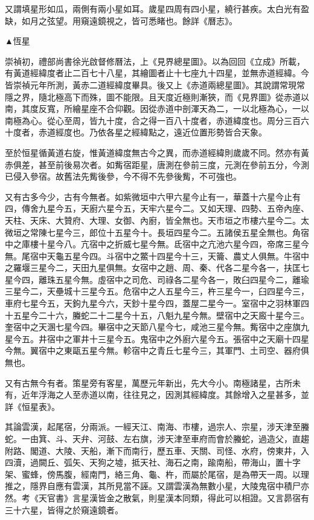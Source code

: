 \begin{pinyinscope}
又謂填星形如瓜，兩側有兩小星如耳。歲星四周有四小星，繞行甚疾。太白光有盈缺，如月之弦望。用窺遠鏡視之，皆可悉睹也。餘詳《曆志》。

▲恆星

崇禎初，禮部尚書徐光啟督修曆法，上《見界總星圖》。以為回回《立成》所載，有黃道經緯度者止二百七十八星，其繪圖者止十七座九十四星，並無赤道經緯。今皆崇禎元年所測，黃赤二道經緯度畢具。後又上《赤道兩總星圖》。其說謂常現常隱之界，隨北極高下而殊，圖不能限。且天度近極則漸狹，而《見界圖》從赤道以南，其度反寬，所繪星座不合仰觀。因從赤道中剖渾天為二，一以北極為心，一以南極為心。從心至周，皆九十度，合之得一百八十度者，赤道緯度也。周分三百六十度者，赤道經度也。乃依各星之經緯點之，遠近位置形勢皆合天象。

至於恒星循黃道右旋，惟黃道緯度無古今之異，而赤道經緯則歲歲不同。然亦有黃赤俱差，甚至前後易次者。如觜宿距星，唐測在參前三度，元測在參前五分，今測已侵入參宿。故舊法先觜後參，今不得不先參後觜，不可強也。

又有古多今少，古有今無者。如紫微垣中六甲六星今止有一，華蓋十六星今止有四，傳舍九星今五，天廚六星今五，天牢六星今二。又如天理、四勢、五帝內座、天柱、天床、大贊府、大理、女御、內廚，皆全無也。天市垣之市樓六星今二。太微垣之常陳七星今三，郎位十五星今十。長垣四星今二。五諸侯五星全無也。角宿中之庫樓十星今八。亢宿中之折威七星今無。氐宿中之亢池六星今四，帝席三星今無。尾宿中天龜五星今四。斗宿中之鱉十四星今十三，天籥、農丈人俱無。牛宿中之羅堰三星今二，天田九星俱無。女宿中之趙、周、秦、代各二星今各一，扶匡七星今四，離珠五星今無。虛宿中之司危、司祿各二星今各一，敗臼四星今二，離瑜三星今二，天壘城十三星今五。危宿中之人五星今三，杵三星今一，臼四星今三，車府七星今五，天鉤九星今六，天鈔十星今四，蓋屋二星今一。室宿中之羽林軍四十五星今二十六，螣蛇二十二星今十五，八魁九星今無。壁宿中之天廄十星今三。奎宿中之天溷七星今四。畢宿中之天節八星今七，咸池三星今無。觜宿中之座旗九星今五。井宿中之軍井十三星今五。鬼宿中之外廚六星今五。張宿中之天廟十四星今無。翼宿中之東甌五星今無。軫宿中之青丘七星今三，其軍門、土司空、器府俱無也。

又有古無今有者。策星旁有客星，萬歷元年新出，先大今小。南極諸星，古所未有，近年浮海之人至赤道以南，往往見之，因測其經緯度。其餘增入之星甚多，並詳《恒星表》。

其論雲漢，起尾宿，分兩派。一經天江、南海、市樓，過宗人、宗星，涉天津至螣蛇。一由箕、斗、天弁、河鼓、左右旗，涉天津至車府而會於螣蛇，過造父，直趨附路、閣道、大陵、天船，漸下而南行，歷五車、天關、司怪、水府，傍東井，入四瀆，過闕丘、弧矢、天狗之墟，抵天社、海石之南，踰南船，帶海山，置十字架、蜜蜂，傍馬腹，經南門，絡三角、龜、杵，而屬於尾宿，是為帶天一周。以理推之，隱界自應有雲漢，其所見當不誣。又謂雲漢為無數小星，大陵鬼宿中積尸亦然。考《天官書》言星漢皆金之散氣，則星漢本同類，得此可以相證。又言昴宿有三十六星，皆得之於窺遠鏡者。


\end{pinyinscope}
